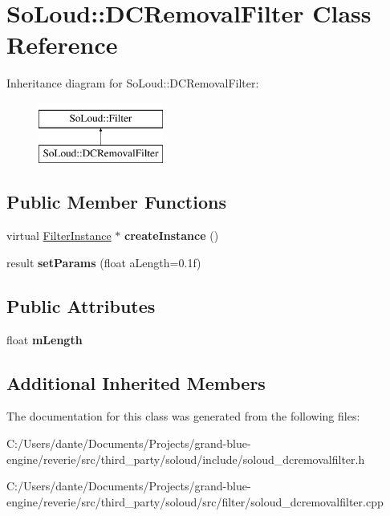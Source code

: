 \hypertarget{class_so_loud_1_1_d_c_removal_filter}{}\section{So\+Loud\+::D\+C\+Removal\+Filter Class Reference}
\label{class_so_loud_1_1_d_c_removal_filter}
Inheritance diagram for So\+Loud\+::D\+C\+Removal\+Filter\+:\begin{figure}[H]
\begin{center}
\leavevmode
\includegraphics[height=2.000000cm]{class_so_loud_1_1_d_c_removal_filter}
\end{center}
\end{figure}
\subsection*{Public Member Functions}
\begin{DoxyCompactItemize}
\item 
\mbox{\label{class_so_loud_1_1_d_c_removal_filter_a95b6d456e7e6f2d53fe7255607d16645}} 
virtual \mbox{\hyperlink{class_so_loud_1_1_filter_instance}{Filter\+Instance}} $\ast$ {\bfseries create\+Instance} ()
\item 
\mbox{\label{class_so_loud_1_1_d_c_removal_filter_aace2e51a78bd1457b719d67079bb1bcd}} 
result {\bfseries set\+Params} (float a\+Length=0.\+1f)
\end{DoxyCompactItemize}
\subsection*{Public Attributes}
\begin{DoxyCompactItemize}
\item 
\mbox{\label{class_so_loud_1_1_d_c_removal_filter_ac2f6517e56840935aade3cfcce7bfcec}} 
float {\bfseries m\+Length}
\end{DoxyCompactItemize}
\subsection*{Additional Inherited Members}


The documentation for this class was generated from the following files\+:\begin{DoxyCompactItemize}
\item 
C\+:/\+Users/dante/\+Documents/\+Projects/grand-\/blue-\/engine/reverie/src/third\+\_\+party/soloud/include/soloud\+\_\+dcremovalfilter.\+h\item 
C\+:/\+Users/dante/\+Documents/\+Projects/grand-\/blue-\/engine/reverie/src/third\+\_\+party/soloud/src/filter/soloud\+\_\+dcremovalfilter.\+cpp\end{DoxyCompactItemize}

